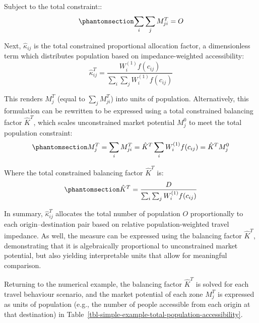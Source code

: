 \documentclass[
  10pt,
  letterpaper,
]{article}
\begin{document}
\noindent Subject to the total constraint::
\begin{equation}\phantomsection\label{eq-total-constraint-O}{
\sum_i \sum_j M^T_{ji} =  O
}\end{equation}

Next, \(\hat \kappa_{ij}\) is the total constrained proportional
allocation factor, a dimensionless term which distributes population
based on impedance-weighted accessibility: \[
\hat \kappa_{ij}^T = \frac{W^{(1)}_i f(c_{ij})}{\sum_i\sum_j W^{(1)}_if(c_{ij})}
\]

This renders \(M_j^T\) (equal to \(\sum_jM_{ji}^T\)) into units of
population. Alternatively, this formulation can be rewritten to be
expressed using a total constrained balancing factor \(\hat K^T\), which
scales unconstrained market potential \(M_j^0\) to meet the total
population constraint:
\begin{equation}\phantomsection\label{eq-total-constrained-market-potential}{
M^T_j = \sum_i M^T_{ji} = \hat K^T \sum_i W^{(1)}_if(c_{ij}) = \hat K^T  M^0_j
}\end{equation}

Where the total constrained balancing factor \(\hat K^T\) is:
\begin{equation}\phantomsection\label{eq-total-population-balancing-factor}{
\hat K^T = \frac{D}{\sum_i\sum_j W^{(1)}_if(c_{ij})}
}\end{equation}

In summary, \(\hat \kappa_{ij}^T\) allocates the total number of
population \(O\) proportionally to each origin--destination pair based
on relative population-weighted travel impedance. As well, the measure
can be expressed using the balancing factor \(\hat K^T\), demonstrating
that it is algebraically proportional to unconstrained market potential,
but also yielding interpretable units that allow for meaningful
comparison.

Returning to the numerical example, the balancing factor \(\hat K^T\) is
solved for each travel behaviour scenario, and the market potential of
each zone \(M^T_j\) is expressed as units of population (e.g., the
number of people accessible from each origin at that destination) in
Table~\ref{tbl-simple-example-total-population-accessibility}.
\end{document}
